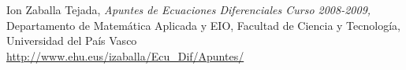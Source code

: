 

\begin{thebibliography}{9}
Ion Zaballa Tejada, \textit{Apuntes de Ecuaciones Diferenciales Curso 2008-2009,} Departamento de Matemática Aplicada y EIO, Facultad de Ciencia y Tecnología, Universidad del País Vasco
\\\url{http://www.ehu.eus/izaballa/Ecu_Dif/Apuntes/}


\end{thebibliography}


